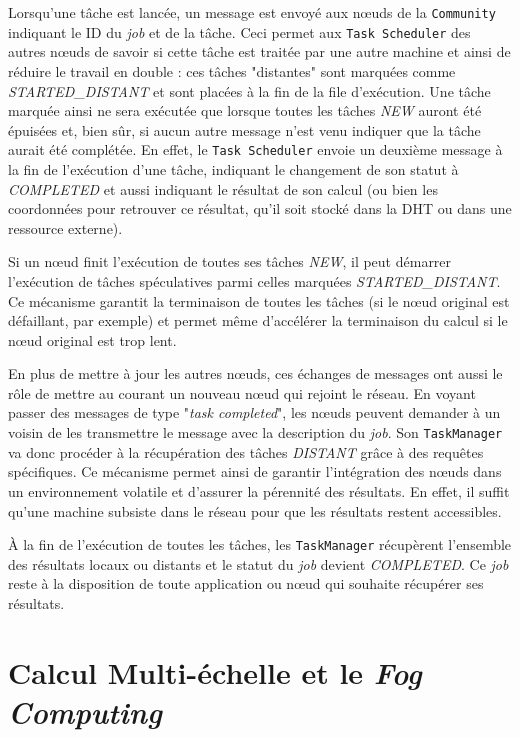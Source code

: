 Lorsqu'une tâche est lancée, un message est envoyé aux n{\oe}uds de la \texttt{Community} indiquant le ID du \textit{job} et de la tâche. Ceci permet aux \texttt{Task Scheduler} des autres n{\oe}uds de savoir si cette tâche est traitée par une autre machine et ainsi de réduire le travail en double : ces tâches "distantes" sont marquées comme \textit{STARTED\_DISTANT} et sont placées à la fin de la file d'exécution. Une tâche marquée ainsi ne sera exécutée que lorsque toutes les tâches \textit{NEW} auront été épuisées et, bien sûr, si aucun autre message n'est venu indiquer que la tâche aurait été complétée. En effet, le \texttt{Task Scheduler} envoie un deuxième message à la fin de l'exécution d'une tâche, indiquant le changement de son statut à \textit{COMPLETED} et aussi indiquant le résultat de son calcul (ou bien les coordonnées pour retrouver ce résultat, qu'il soit stocké dans la DHT ou dans une ressource externe).

Si un n{\oe}ud finit l'exécution de toutes ses tâches \textit{NEW}, il peut démarrer l'exécution de tâches spéculatives parmi celles marquées \textit{STARTED\_DISTANT}. Ce mécanisme garantit la terminaison de toutes les tâches (si le n{\oe}ud original est défaillant, par exemple) et permet même d'accélérer la terminaison du calcul si le n{\oe}ud original est trop lent.

En plus de mettre à jour les autres n{\oe}uds, ces échanges de messages ont aussi le rôle de mettre au courant un nouveau n{\oe}ud qui rejoint le réseau. En voyant passer des messages de type "\textit{task completed}", les n{\oe}uds peuvent demander à un voisin de les transmettre le message avec la description du \textit{job}. Son \texttt{TaskManager} va donc procéder à la récupération des tâches \textit{DISTANT} grâce à des requêtes spécifiques. Ce mécanisme permet ainsi de garantir l'intégration des n{\oe}uds dans un environnement volatile et d'assurer la pérennité des résultats. En effet, il suffit qu'une machine subsiste dans le réseau pour que les résultats restent accessibles.

À la fin de l'exécution de toutes les tâches, les \texttt{TaskManager} récupèrent l'ensemble des résultats locaux ou distants et le statut du \textit{job} devient \textit{COMPLETED}. Ce \textit{job} reste à la disposition de toute application ou n{\oe}ud qui souhaite récupérer ses résultats.


\section{Calcul Multi-échelle et le \textit{Fog Computing}\label{sec:multiechelle}}

